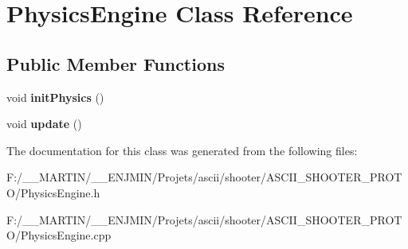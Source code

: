 \hypertarget{class_physics_engine}{}\section{Physics\+Engine Class Reference}
\label{class_physics_engine}
\subsection*{Public Member Functions}
\begin{DoxyCompactItemize}
\item 
\hypertarget{class_physics_engine_a1051e5a80e27864cc8d9c6cfd696c29a}{}\label{class_physics_engine_a1051e5a80e27864cc8d9c6cfd696c29a} 
void {\bfseries init\+Physics} ()
\item 
\hypertarget{class_physics_engine_ac4951e3070893b809ec9b8888ad92e07}{}\label{class_physics_engine_ac4951e3070893b809ec9b8888ad92e07} 
void {\bfseries update} ()
\end{DoxyCompactItemize}


The documentation for this class was generated from the following files\+:\begin{DoxyCompactItemize}
\item 
F\+:/\+\_\+\+\_\+\+M\+A\+R\+T\+I\+N/\+\_\+\+\_\+\+E\+N\+J\+M\+I\+N/\+Projets/ascii/shooter/\+A\+S\+C\+I\+I\+\_\+\+S\+H\+O\+O\+T\+E\+R\+\_\+\+P\+R\+O\+T\+O/Physics\+Engine.\+h\item 
F\+:/\+\_\+\+\_\+\+M\+A\+R\+T\+I\+N/\+\_\+\+\_\+\+E\+N\+J\+M\+I\+N/\+Projets/ascii/shooter/\+A\+S\+C\+I\+I\+\_\+\+S\+H\+O\+O\+T\+E\+R\+\_\+\+P\+R\+O\+T\+O/Physics\+Engine.\+cpp\end{DoxyCompactItemize}
